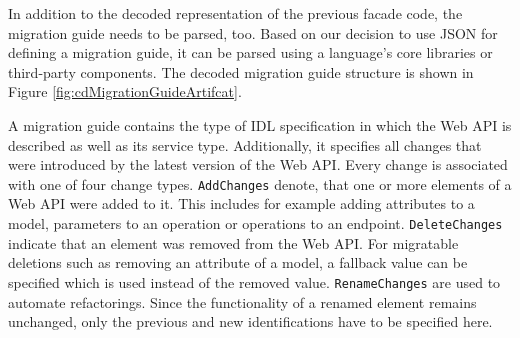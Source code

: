 \begin{figure}[!h]
\end{figure}

In addition to the decoded representation of the previous facade code, the migration guide needs to be parsed, too. Based on our decision to use \ac{JSON} for defining a migration guide, it can be parsed using a language's core libraries or third-party components. The decoded migration guide structure is shown in Figure \ref{fig:cdMigrationGuideArtifcat}. 

A migration guide contains the type of \ac{IDL} specification in which the Web API is described as well as its service type. Additionally, it specifies all changes that were introduced by the latest version of the Web API. Every change is associated with one of four change types. \texttt{Add\-Changes} denote, that one or more elements of a Web API were added to it. This includes for example adding attributes to a model, parameters to an operation or operations to an endpoint. \texttt{Delete\-Changes} indicate that an element was removed from the Web API. For migratable deletions such as removing an attribute of a model, a fallback value can be specified which is used instead of the removed value. \texttt{Rename\-Changes} are used to automate refactorings. Since the functionality of a renamed element remains unchanged, only the previous and new identifications have to be specified here. 

